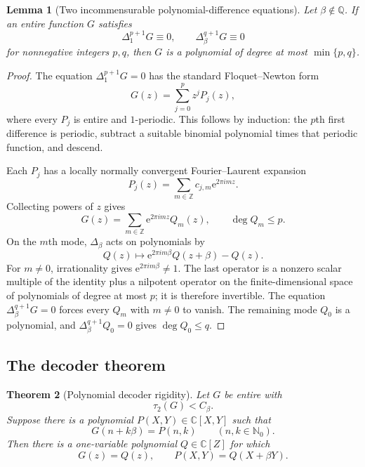 \documentclass[11pt,oneside]{article}
\newtheorem{theorem}{Theorem}[section]
\newtheorem{lemma}[theorem]{Lemma}
\theoremstyle{definition}
\theoremstyle{remark}
\newcommand{\Nzero}{\mathbb N_0}
\newcommand{\Z}{\mathbb Z}
\newcommand{\Q}{\mathbb Q}
\newcommand{\C}{\mathbb C}
\newcommand{\ee}{\mathrm e}
\newcommand{\Cbeta}{C_\beta}
\newcommand{\Del}[1]{\Delta_{#1}}
\begin{document}
\begin{lemma}[Two incommensurable polynomial-difference equations]
\label{lem:twodifference}
Let $\beta\notin\Q$.  If an entire function $G$ satisfies
\[
 \Del{1}^{p+1}G\equiv0,
 \qquad
 \Del{\beta}^{q+1}G\equiv0
\]
for nonnegative integers $p,q$, then $G$ is a polynomial of degree at most
$\min\{p,q\}$.
\end{lemma}

\begin{proof}
The equation $\Del{1}^{p+1}G=0$ has the standard Floquet--Newton form
\begin{equation}
 G(z)=\sum_{j=0}^{p}z^j P_j(z),
 \label{eq:floquetpoly}
\end{equation}
where every $P_j$ is entire and $1$-periodic.  This follows by induction: the $p$th first
difference is periodic, subtract a suitable binomial polynomial times that periodic
function, and descend.

Each $P_j$ has a locally normally convergent Fourier--Laurent expansion
\[
 P_j(z)=\sum_{m\in\Z}c_{j,m}\ee^{2\pi i m z}.
\]
Collecting powers of $z$ gives
\[
 G(z)=\sum_{m\in\Z}\ee^{2\pi i m z}Q_m(z),
 \qquad \deg Q_m\le p.
\]
On the $m$th mode, $\Del{\beta}$ acts on polynomials by
\[
 Q(z)\longmapsto
 \ee^{2\pi i m\beta}Q(z+\beta)-Q(z).
\]
For $m\ne0$, irrationality gives $\ee^{2\pi i m\beta}\ne1$.  The last operator is a
nonzero scalar multiple of the identity plus a nilpotent operator on the finite-dimensional
space of polynomials of degree at most $p$; it is therefore invertible.  The equation
$\Del{\beta}^{q+1}G=0$ forces every $Q_m$ with $m\ne0$ to vanish.  The remaining mode
$Q_0$ is a polynomial, and $\Del{\beta}^{q+1}Q_0=0$ gives $\deg Q_0\le q$.
\end{proof}

\subsection{The decoder theorem}

\begin{theorem}[Polynomial decoder rigidity]
\label{thm:polydecoder}
Let $G$ be entire with
\[
 \tau_2(G)<\Cbeta.
\]
Suppose there is a polynomial $P(X,Y)\in\C[X,Y]$ such that
\begin{equation}
 G(n+k\beta)=P(n,k)
 \qquad(n,k\in\Nzero).
 \label{eq:decoder}
\end{equation}
Then there is a one-variable polynomial $Q\in\C[Z]$ for which
\begin{equation}
 G(z)=Q(z),
 \qquad
 P(X,Y)=Q(X+\beta Y).
 \label{eq:factorline}
\end{equation}
\end{theorem}
\end{document}
